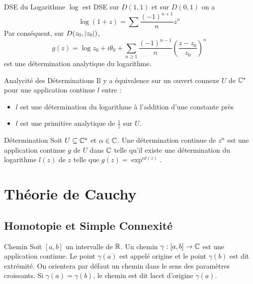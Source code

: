 \documentclass{cours}
\begin{document}
\begin{propositionfr}{DSE du Logarithme}{}
    $\log$ est DSE sur $D(1, 1)$ et sur $D(0, 1)$ on a
    \[
        \log(1 + z) = \sum \frac{(-1)^{n + 1}}{n}z^{n}
    \]
    Par conséquent, sur $D(z_{0}, \left|z_{0}\right|)$, 
    \[
        g(z) = \log z_{0} + i\theta_{0} + \sum_{n \geq 1}\frac{(-1)^{n - 1}}{n}\left(\frac{z - z_{0}}{z_{0}}\right)^{n}
    \]
    est une détermination analytique du logarithme. 
\end{propositionfr}

\begin{propositionfr}{Analycité des Déterminations}{}
    Il y a équivalence sur un ouvert connexe $U$ de $\mathbb{C}^{\star}$ pour une application continue $l$ entre : 
    \begin{itemize}
        \item $l$ est une détermination du logarithme à l'addition d'une constante près
        \item $l$ est une primitive analytique de $\frac{1}{z}$ sur $U$. 
    \end{itemize}
\end{propositionfr}

\begin{définition}{Détermination}{}
    Soit $U \subseteq \mathbb{C}^{\star}$ et $\alpha \in \mathbb{C}$. Une détermination continue de $z^{\alpha}$ est une application continue $g$ de $U$ dans $\mathbb{C}$ telle qu'il existe une détermination du logarithme $l(z)$ de $z$ telle que $g(z) = \exp^{\alpha l(z)}$.
\end{définition}

\section{Théorie de Cauchy}
\subsection{Homotopie et Simple Connexité}
\begin{définition}{Chemin}{}
    Soit $\left[a, b\right]$ un intervalle de $\mathbb{R}$. Un chemin $\gamma: \left[a, b\right] \to \mathbb{C}$ est une application continue. Le point $\gamma(a)$ est appelé origine et le point $\gamma(b)$ est dit extrémité. On orientera par défaut un chemin dans le sens des paramètres croissants. Si $\gamma(a) = \gamma(b)$, le chemin est dit lacet d'origine $\gamma(a)$.
\end{définition}
\end{document}
